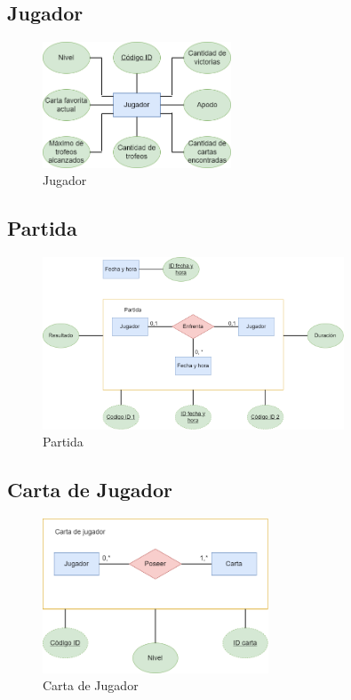 \subsection{Jugador}
\begin{figure}[H]
\centering
\includegraphics[width=0.5\textwidth]{../images/merx_player.png}
\caption{Jugador}
\end{figure}

\subsection{Partida}
\begin{figure}[H]
\centering
\includegraphics[width=0.80\textwidth]{../images/merx_match.png}
\caption{Partida}
\end{figure}

\subsection{Carta de Jugador}
\begin{figure}[H]
\centering
\includegraphics[width=0.60\textwidth]{../images/merx_playercard.png}
\caption{Carta de Jugador}
\end{figure}

